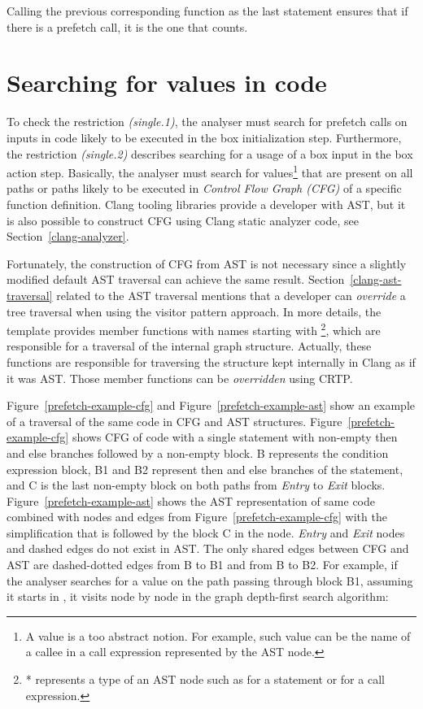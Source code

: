 Calling the previous corresponding  function as the last statement ensures that if there is a prefetch call, it is the one that counts.

\section{Searching for values in code}
To check the restriction \emph{(single.1)}, the analyser must search for prefetch calls on inputs in code likely to be executed in the box initialization step. Furthermore, the restriction \emph{(single.2)} describes searching for a usage of a box input in the box action step. Basically, the analyser must search for values\footnote{A value is a too abstract notion. For example, such value can be the name of a callee in a call expression represented by the  AST node.} that are present on all paths or paths likely to be executed in \emph{Control Flow Graph (CFG)} of a specific function definition. Clang tooling libraries provide a developer with AST, but it is also possible to construct CFG using Clang static analyzer code, see Section~\ref{clang-analyzer}.

Fortunately, the construction of CFG from AST is not necessary since a slightly modified default AST traversal can achieve the same result. Section~\ref{clang-ast-traversal} related to the AST traversal mentions that a developer can \textit{override} a tree traversal when using the visitor pattern approach. In more details, the  template provides member functions with names starting with \footnote{* represents a type of an AST node such as  for a statement or  for a call expression.}, which are responsible for a traversal of the internal graph structure. Actually, these functions are responsible for traversing the structure kept internally in Clang as if it was AST. Those member functions can be \textit{overridden} using CRTP.

Figure~\ref{prefetch-example-cfg} and Figure~\ref{prefetch-example-ast} show an example of a traversal of the same code in CFG and AST structures. Figure~\ref{prefetch-example-cfg} shows CFG of code with a single  statement with non-empty then and else branches followed by a non-empty block. B represents the condition expression block, B1 and B2 represent then and else branches of the  statement, and C is the last non-empty block on both paths from \emph{Entry} to \emph{Exit} blocks. Figure~\ref{prefetch-example-ast} shows the AST representation of same code combined with nodes and edges from Figure~\ref{prefetch-example-cfg} with the simplification that  is followed by the block C in the  node. \emph{Entry} and \emph{Exit} nodes and dashed edges do not exist in AST. The only shared edges between CFG and AST are dashed-dotted edges from B to B1 and from B to B2. For example, if the analyser searches for a value on the path passing through block B1, assuming it starts in , it visits node by node in the graph depth-first search algorithm:

